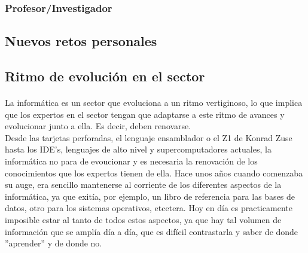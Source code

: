 \documentclass[11pt, a4paper]{report}
\begin{document}
        		\paragraph{}
        	
    		\subsubsection{Profesor/Investigador}
        		\paragraph{}
                
                
    	\subsection{Nuevos retos personales}
        	\paragraph{}



		\subsection{Ritmo de evolución en el sector}
        	\paragraph{}
			La informática es un sector que evoluciona a un ritmo vertiginoso, lo que implica que los expertos en el sector tengan que adaptarse a este ritmo de avances y evolucionar junto a ella. Es decir, deben renovarse.\\
            
            Desde las tarjetas perforadas, el lenguaje ensamblador o el Z1 de Konrad Zuse hasta los IDE's, lenguajes de alto nivel y supercomputadores actuales, la informática no para de evoucionar y es necesaria la renovación de los conocimientos que los expertos tienen de ella. Hace unos años cuando comenzaba su auge, era sencillo mantenerse al corriente de los diferentes aspectos de la informática, ya que exitía, por ejemplo, un libro de referencia para las bases de datos, otro para los sistemas operativos, etcetera. Hoy en día es practicamente imposible estar al tanto de todos estos aspectos, ya que hay tal volumen de información que se amplía día a día, que es difícil contrastarla y saber de donde ''aprender'' y de donde no.\\
            
\end{document}
